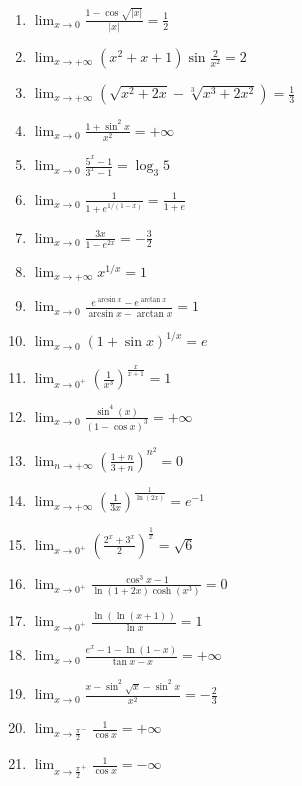 \documentclass[11pt,a4paper]{article}
\begin{document}
\begin{enumerate}
\item $\displaystyle \lim_{x \to 0} \frac{1 - \cos\sqrt{\left|x\right|}}{\left|x\right|} = \frac{1}{2}$
\item $\displaystyle \lim_{x \to +\infty} (x^{2} + x + 1)\sin\frac{2}{x^{2}} = 2$
\item $\displaystyle \lim_{x \to +\infty} \left(\sqrt{x^{2} + 2x} - \sqrt[3]{x^{3} + 2x^{2}}\right) = \frac{1}{3}$
\item $\displaystyle \lim_{x \to 0} \frac{1 + \sin^{2} x}{x^{2}} = +\infty$
\item $\displaystyle \lim_{x \to 0} \frac{5^{x} - 1}{3^{x} - 1} = \log_{3} 5$
\item $\displaystyle \lim_{x \to 0} \frac{1}{1 + e^{1/(1 - x)}} = \frac{1}{1 + e}$
\item $\displaystyle \lim_{x \to 0} \frac{3x}{1 - e^{2x}} = -\frac{3}{2}$
\item $\displaystyle \lim_{x \to +\infty} x^{1/x} = 1$
\item $\displaystyle \lim_{x \to 0} \frac{e^{\arcsin x} - e^{\arctan x}}{\arcsin x - \arctan x} = 1$
\item $\displaystyle \lim_{x \to 0} (1 + \sin x)^{1/x} = e$
\item $\displaystyle \lim_{x \to 0^{+}} \left(\frac{1}{x^{3}}\right)^{\frac{x}{x + 1}} = 1$
\item $\displaystyle \lim_{x \to 0} \frac{\sin^{4}(x)}{(1 - \cos x)^{3}} = +\infty$
\item $\displaystyle \lim_{n \to +\infty} \left(\frac{1 + n}{3 + n}\right)^{n^{2}} = 0$
\item $\displaystyle \lim_{x \to +\infty} \left(\frac{1}{3x}\right)^{\frac{1}{\ln(2x)}} = e^{-1}$
\item $\displaystyle \lim_{x \to 0^{+}} \left(\frac{2^{x} + 3^{x}}{2}\right)^{\frac{1}{x}} = \sqrt{6}$
\item $\displaystyle \lim_{x \to 0^{+}} \frac{\cos^{3} x - 1}{\ln(1 + 2x)\cosh(x^{3})} = 0$
\item $\displaystyle \lim_{x \to 0^{+}} \frac{\ln(\ln(x + 1))}{\ln x} = 1$
\item $\displaystyle \lim_{x \to 0} \frac{e^{x} - 1 - \ln(1 - x)}{\tan x - x} = +\infty$
\item $\displaystyle \lim_{x \to 0} \frac{x - \sin^{2}\sqrt{x} - \sin^{2} x}{x^{2}} = -\frac{2}{3}$
\item $\displaystyle \lim_{x \to \frac{\pi}{2}^{-}} \frac{1}{\cos x} = +\infty$
\item $\displaystyle \lim_{x \to \frac{\pi}{2}^{+}} \frac{1}{\cos x} = -\infty$

\end{enumerate}
\end{document}
